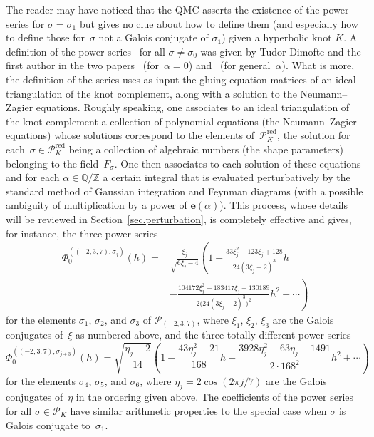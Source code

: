 \documentclass[pdftex]{sigma}
\numberwithin{equation}{section}
\def\calP{\mathcal P}
\def\calP{\mathcal P}
\def\e{\mathbf{e}}
\def\a{\alpha}
\def\Z{\mathbb Z}
\def\Q{\mathbb Q}
\def\m{ - }
\def\e{\mathbf{e}}
\def\a{\alpha}
\def\s{\sigma}
\def\be{\begin{equation}}
\def\ee{\end{equation}}
\def\RED{^{\text{red}}}
\def\calPx{\mathcal{P}\RED} %
\begin{document}
The reader may have noticed that the QMC asserts the existence of the power
series \smash{$\Phi^{(K,\s)}_\a(h)$} for $\s=\s_1$ but gives no clue about how to define
them (and especially how to define those for~$\s$ not a Galois conjugate of
$\s_1$) given a hyperbolic knot $K$. A definition of the power series~\smash{$\Phi^{(K,\s)}_\a(h)$} for all $\s \neq \s_0$ was given by Tudor Dimofte and
the first author in the two papers~\cite{DG} (for~$\a=0$) and~\cite{DG2}
(for general~$\a$). What is more, the definition of the series uses as
input the gluing equation matrices of an ideal triangulation of the
knot complement, along with a solution to the Neumann--Zagier equations.
Roughly
speaking, one associates to an ideal triangulation of the knot complement
a collection of polynomial equations (the Neumann--Zagier equations) whose
solutions correspond to the elements of~$\calPx_K$, the solution for
each~$\s\in\calPx_K$ being a collection of algebraic numbers (the shape
parameters) belonging to the field~$F_\s$. One then associates to each
solution of these equations and for each $\a\in\Q/\Z$ a certain integral
that is evaluated perturbatively by the standard method of Gaussian
integration and Feynman diagrams (with a possible ambiguity of multiplication
by a power of $\e(\a)$). This process, whose details will be reviewed in
Section~\ref{sec.perturbation}, is completely effective and gives, for
instance, the three power series
\begin{align}
\Phi^{((-2,3,7),\s_j)}_0(h)
 ={}& \frac{\xi_j}{\sqrt{6\xi_j-4}}
\left(1 \m \frac{33\xi_j^2 - 123\xi_j + 128}{24(3\xi_j-2)^3} h
\right.\nonumber\\
&\left.- \frac{104172\xi_j^2 - 183417\xi_j + 130189}{2 \big(24(3\xi_j-2)^3\big)^2} h^2+ \cdots\right)\label{Phi237.123}
\end{align}
for the elements $\s_1$, $\s_2$, and $\s_3$ of $\calP_{(-2,3,7)}$, where
$\xi_1$, $\xi_2$, $\xi_3$ are the Galois conjugates of~$\xi$ as numbered above,
and the three totally different power series
\be
\label{Phi237.456}
\Phi^{((-2,3,7),\s_{j+3})}_0(h) =
 \sqrt{\frac{\eta_j-2}{14}} \left(1 \m \frac{43\eta_j^2 -21}{168} h
- \frac{3928\eta_j^2 + 63\eta_j -1491}{2\cdot 168^2} h^2 + \cdots\right)
\ee
for the elements $\s_4$, $\s_5$, and $\s_6$, where $\eta_j=2\cos(2\pi j/7)$
are the Galois conjugates of~$\eta$ in the ordering given above. The
coefficients of the power series \smash{$\Phi^{(K,\s)}(h)$} for all $\s\in\calP_K$
have similar arithmetic properties to the special case when $\s$ is Galois
conjugate to~$\s_1$.
\end{document}
